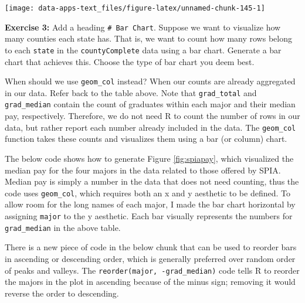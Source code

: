 \documentclass[
]{book}
\newenvironment{rmdblock}[1]
  {\begin{shaded*}
  }
  {\end{shaded*}
  }
\newenvironment{learncheck}
  {\begin{rmdblock}{warning}}
  {\end{rmdblock}}
\begin{document}
\begin{center}\texttt{[image: data-apps-text\_files/figure-latex/unnamed-chunk-145-1]} \end{center}

\begin{learncheck}
\textbf{Exercise 3:} Add a heading \texttt{\#\ Bar\ Chart}. Suppose we
want to visualize how many counties each state has. That is, we want to
count how many rows belong to each \texttt{state} in the
\texttt{countyComplete} data using a bar chart. Generate a bar chart
that achieves this. Choose the type of bar chart you deem best.
\end{learncheck}

When should we use \texttt{geom\_col} instead? When our counts are already aggregated in our data. Refer back to the table above. Note that \texttt{grad\_total} and \texttt{grad\_median} contain the count of graduates within each major and their median pay, respectively. Therefore, we do not need R to count the number of rows in our data, but rather report each number already included in the data. The \texttt{geom\_col} function takes these counts and visualizes them using a bar (or column) chart.

The below code shows how to generate Figure \ref{fig:spiapay}, which visualized the median pay for the four majors in the data related to those offered by SPIA. Median pay is simply a number in the data that does not need counting, thus the code uses \texttt{geom\_col}, which requires both an x and y aesthetic to be defined. To allow room for the long names of each major, I made the bar chart horizontal by assigning \texttt{major} to the y aesthetic. Each bar visually represents the numbers for \texttt{grad\_median} in the above table.

There is a new piece of code in the below chunk that can be used to reorder bars in ascending or descending order, which is generally preferred over random order of peaks and valleys. The \texttt{reorder(major,\ -grad\_median)} code tells R to reorder the majors in the plot in ascending because of the minus sign; removing it would reverse the order to descending.
\end{document}
